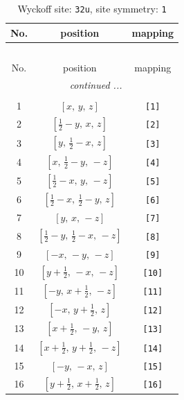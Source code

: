 \documentclass[fleqn,8pt]{jsarticle}
\begin{document}
\renewcommand{\arraystretch}{1.2}
\begin{longtable}{ccc}
\caption{Wyckoff site: {\tt 32u}, site symmetry: {\tt 1}}
 \\
 \hline \hline
No. & position & mapping \\ \hline \endfirsthead

\multicolumn{2}{l}{\tablename\ \thetable{}} \\
 \hline \hline
No. & position & mapping \\ \hline \endhead

 \hline \hline
\multicolumn{2}{r}{\footnotesize\it continued ...} \\ \endfoot

 \hline \hline
\multicolumn{2}{r}{} \\ \endlastfoot

1 & $\left[ x,\, y,\, z \right]$ & {\tt [1]} \\ \hline
2 & $\left[ \frac{1}{2} - y,\, x,\, z \right]$ & {\tt [2]} \\ \hline
3 & $\left[ y,\, \frac{1}{2} - x,\, z \right]$ & {\tt [3]} \\ \hline
4 & $\left[ x,\, \frac{1}{2} - y,\, - z \right]$ & {\tt [4]} \\ \hline
5 & $\left[ \frac{1}{2} - x,\, y,\, - z \right]$ & {\tt [5]} \\ \hline
6 & $\left[ \frac{1}{2} - x,\, \frac{1}{2} - y,\, z \right]$ & {\tt [6]} \\ \hline
7 & $\left[ y,\, x,\, - z \right]$ & {\tt [7]} \\ \hline
8 & $\left[ \frac{1}{2} - y,\, \frac{1}{2} - x,\, - z \right]$ & {\tt [8]} \\ \hline
9 & $\left[ - x,\, - y,\, - z \right]$ & {\tt [9]} \\ \hline
10 & $\left[ y + \frac{1}{2},\, - x,\, - z \right]$ & {\tt [10]} \\ \hline
11 & $\left[ - y,\, x + \frac{1}{2},\, - z \right]$ & {\tt [11]} \\ \hline
12 & $\left[ - x,\, y + \frac{1}{2},\, z \right]$ & {\tt [12]} \\ \hline
13 & $\left[ x + \frac{1}{2},\, - y,\, z \right]$ & {\tt [13]} \\ \hline
14 & $\left[ x + \frac{1}{2},\, y + \frac{1}{2},\, - z \right]$ & {\tt [14]} \\ \hline
15 & $\left[ - y,\, - x,\, z \right]$ & {\tt [15]} \\ \hline
16 & $\left[ y + \frac{1}{2},\, x + \frac{1}{2},\, z \right]$ & {\tt [16]} \\ \hline

\end{longtable}
\end{document}
